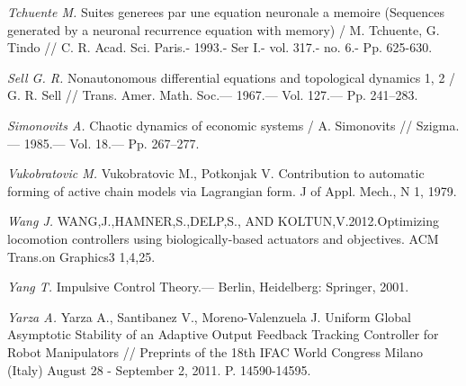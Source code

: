 \begin{thebibliography}{10}
	{\it Tchuente M.} Suites generees par une equation neuronale a memoire (Sequences generated by a neuronal recurrence equation with memory) / M. Tchuente, G. Tindo // C. R. Acad. Sci. Paris.- 1993.- Ser I.- vol. 317.- no. 6.- Pp. 625-630.
	
	{\it Sell G. R.} Nonautonomous differential equations and topological dynamics 1, 2 /
	G. R. Sell // Trans. Amer. Math. Soc.— 1967.— Vol. 127.— Pp. 241–283.
	
	{\it Simonovits A.} Chaotic dynamics of economic systems /
	A. Simonovits // Szigma.— 1985.— Vol. 18.— Pp. 267–277.
	
	{\it Vukobratovic M.} Vukobratovic M., Potkonjak V. Contribution to automatic forming of active chain models via Lagrangian form. J of Appl. Mech., N 1, 1979.
	
	{\it Wang J.} WANG,J.,HAMNER,S.,DELP,S., AND KOLTUN,V.2012.Optimizing locomotion controllers using biologically-based actuators and objectives. ACM Trans.on Graphics3 1,4,25.
	
	{\it Yang T.} Impulsive Control Theory.— Berlin, Heidelberg: Springer, 2001.
	
	{\it Yarza A.} Yarza A., Santibanez V., Moreno-Valenzuela J. Uniform Global Asymptotic Stability of an Adaptive Output Feedback Tracking Controller for Robot Manipulators // Preprints of the 18th IFAC World Congress Milano (Italy) August 28 - September 2, 2011. P. 14590-14595. 
	
	
\end{thebibliography} 